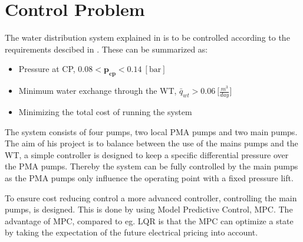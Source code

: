 \section{Control Problem}
\label{control_problem}
The water distribution system explained in  is to be controlled according to the requirements descibed in . These can be summarized as: 
\begin{itemize}
	\item Pressure at CP, $0.08 < \pmb{p_{cp}} < 0.14 \:[\text{bar}]$
%
	\item Minimum water exchange through the WT, $\bar{q}_{wt} > 0.06 \: \big[\frac{m^3}{day}\big]$
%
	\item Minimizing the total cost of running the system
\end{itemize}

The system consists of four pumps, two local PMA pumps and two main pumps. The aim of his project is to balance between the use of the mains pumps and the WT, a simple controller is designed to keep a specific differential pressure over the PMA pumps. Thereby the system can be fully controlled by the main pumps as the PMA pumps only influence the operating point with a fixed pressure lift.

To ensure cost reducing control a more advanced controller, controlling the main pumps, is designed. This is done by using Model Predictive Control, MPC. The advantage of MPC, compared to eg. LQR is that the MPC can optimize a state by taking the expectation of the future electrical pricing into account. 

